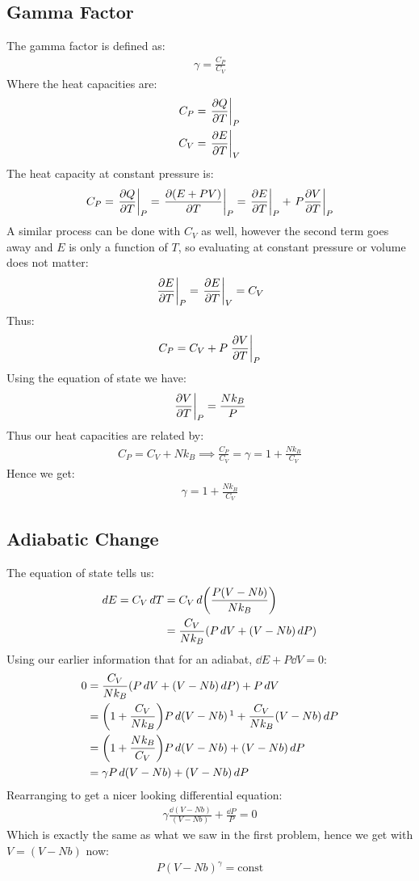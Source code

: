\documentclass[12pt]{article}
\begin{document}
\subsection{Gamma Factor}
The gamma factor is defined as:
\begin{align*}
  \gamma=\frac{C_P}{C_V}
\end{align*}
Where the heat capacities are:
\begin{align*}
  C_P&=\eval{\pdv{Q}{T}}_P\\
  C_V&=\eval{\pdv{E}{T}}_V
\end{align*}
The heat capacity at constant pressure is:
\begin{align*}
  C_P=\eval{\pdv{Q}{T}}_P=\eval{\pdv{(E+PV)}{T}}_P
  =\eval{\pdv{E}{T}}_P+\eval{P\pdv{V}{T}}_P
\end{align*}
A similar process can be done with $C_V$ as well, however the second term goes away and $E$ is only a function of $T$, so evaluating at constant pressure or volume does not matter:
\begin{align*}
  \eval{\pdv{E}{T}}_P=\eval{\pdv{E}{T}}_V=C_V
\end{align*}
Thus:
\begin{align*}
  C_P=C_V+P\eval{\pdv{V}{T}}_{P}
\end{align*}
Using the equation of state we have:
\begin{align*}
  \eval{\pdv{V}{T}}_P=\frac{Nk_B}{P}
\end{align*}
Thus our heat capacities are related by:
\begin{align*}
  C_P=C_V+Nk_B\implies\frac{C_P}{C_V}=\gamma=1+\frac{Nk_B}{C_V}
\end{align*}
Hence we get:
\begin{align}
  \boxed{\gamma=1+\frac{Nk_B}{C_V}}
\end{align}
\subsection{Adiabatic Change}
The equation of state tells us:
\begin{align*}
  \dd{E}=C_V\dd{T}&=C_V\dd{\qty(\frac{P(V-Nb)}{Nk_B})}\\
  &=\frac{C_V}{Nk_B}\qty(P\dd{V}+(V-Nb)\dd{P})
\end{align*}
Using our earlier information that for an adiabat, $\dd{E}+P\dd{V}=0$:
\begin{align*}
  0&=\frac{C_V}{Nk_B}\qty(P\dd{V}+(V-Nb)\dd{P})+P\dd{V}\\
  &=\qty(1+\frac{C_V}{Nk_B})P\dd{(V-Nb)}\footnotemark+
  \frac{C_V}{Nk_B}(V-Nb)\dd{P}\\
  &=\qty(1+\frac{Nk_B}{C_V})P\dd{(V-Nb)}+(V-Nb)\dd{P}\\
  &=\gamma P\dd{(V-Nb)}+(V-Nb)\dd{P}
\end{align*}
Rearranging to get a nicer looking differential equation:
\begin{align*}
  \gamma\frac{\dd{(V-Nb)}}{(V-Nb)}+\frac{\dd{P}}{P}=0
\end{align*}
Which is exactly the same as what we saw in the first problem, hence we get with $V=(V-Nb)$ now:
\begin{align}
  \boxed{P(V-Nb)^\gamma=\text{const}}
\end{align}
\newpage
\end{document}
